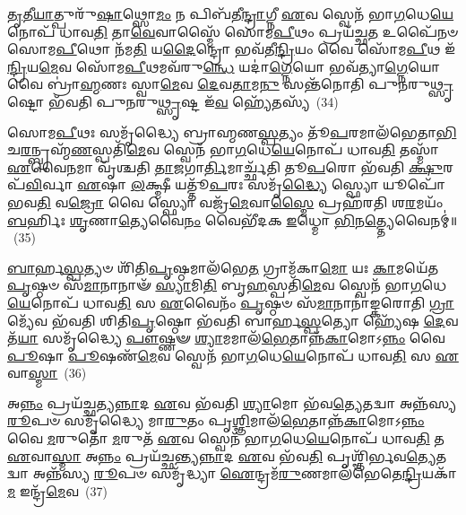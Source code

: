 \-\ul{𑌤𑍃}\-𑌤𑍀\-\ul{𑌯𑌾}\-𑌤𑍍𑌪𑍁𑌰𑍁᳴\-\ul{𑌷𑌾}\-𑌥𑍍𑌸𑍋\-\ul{𑌮𑌂} 𑌨 𑌪𑌿𑌬᳴𑌤𑍀\-\ul{𑌨𑍍𑌦𑍍𑌰𑌾}\-𑌗𑍍𑌨𑍀 \ul{𑌏}\-𑌵 𑌸𑍍𑌵𑍇𑌨᳴ 𑌭𑌾\-\ul{𑌗}\-𑌧𑍇\-\ul{𑌯𑍇}\-𑌨𑍋𑌪᳴ 𑌧𑌾𑌵\-\ul{𑌤𑌿} 𑌤𑌾\-\ul{𑌵𑍇}\-𑌵𑌾𑌸𑍍𑌮𑍈᳴ 𑌸𑍋𑌮\-\ul{𑌪𑍀}\-𑌥𑌂 𑌪𑍍𑌰𑌯᳴𑌚𑍍𑌛\-\ul{𑌤} 𑌉𑌪𑍈᳴𑌨𑍞 𑌸𑍋𑌮\-\ul{𑌪𑍀}\-𑌥𑍋 𑌨᳴𑌮\-\ul{𑌤𑌿} 𑌯\-\ul{𑌦𑍈}\-𑌨𑍍𑌦𑍍𑌰𑍋 𑌭𑌵᳴𑌤𑍀\-\ul{𑌨𑍍𑌦𑍍𑌰𑌿}\-𑌯𑌂 𑌵𑍈 𑌸𑍋᳴𑌮\-\ul{𑌪𑍀}\-𑌥 𑌇᳴\-\ul{𑌨𑍍𑌦𑍍𑌰𑌿}\-𑌯\-\ul{𑌮𑍇}\-𑌵 𑌸𑍋᳴𑌮\-\ul{𑌪𑍀}\-𑌥𑌮𑌵᳴\-𑌰𑍁\-\ul{𑌨𑍍𑌧𑍇} 𑌯𑌦𑌾॑\-\ul{𑌗𑍍𑌨𑍇}\-𑌯𑍋 𑌭𑌵᳴𑌤𑍍𑌯𑌾\-\ul{𑌗𑍍𑌨𑍇}\-𑌯𑍋 𑌵𑍈 𑌬𑍍𑌰𑌾॑\-\ul{𑌹𑍍𑌮}\-𑌣𑌃 𑌸𑍍𑌵𑌾\-\ul{𑌮𑍇}\-𑌵 \ul{𑌦𑍇}\-𑌵\-\ul{𑌤𑌾}\-𑌮\-\ul{𑌨𑍁} 𑌸𑌨𑍍𑌤᳴𑌨𑍋𑌤𑌿 𑌪𑍁𑌨𑌰𑍁\-\ul{𑌥𑍍𑌸𑍃}\-𑌷𑍍𑌟𑍋 𑌭᳴𑌵𑌤𑌿 𑌪𑍁𑌨𑌰𑍁\-\ul{𑌥𑍍𑌸𑍃}\-𑌷𑍍𑌟 𑌇᳴\-\ul{𑌵} 𑌹𑍍𑌯𑍇᳴𑌤𑌸𑍍𑌯᳴~(34)

𑌸𑍋𑌮\-\ul{𑌪𑍀}\-𑌥𑌃 𑌸𑌮𑍃᳴𑌦𑍍𑌧𑍍𑌯𑍈 𑌬𑍍𑌰𑌾𑌹𑍍𑌮𑌣\-\ul{𑌸𑍍𑌪}\-𑌤𑍍𑌯𑌂 𑌤𑍂᳴\-\ul{𑌪}\-𑌰𑌮𑌾𑌲᳴𑌭𑍇𑌤𑌾\-\ul{𑌭𑌿}\-\-𑌚\-\ul{𑌰}\-𑌨𑍍𑌬𑍍𑌰𑌹𑍍𑌮᳴\-\ul{𑌣}\-𑌸𑍍𑌪𑌤𑌿᳴\-\ul{𑌮𑍇}\-𑌵 𑌸𑍍𑌵𑍇𑌨᳴ 𑌭𑌾\-\ul{𑌗}\-𑌧𑍇\-\ul{𑌯𑍇}\-𑌨𑍋𑌪᳴ 𑌧𑌾𑌵\-\ul{𑌤𑌿} 𑌤𑌸𑍍𑌮𑌾᳴ \ul{𑌏}\-𑌵𑍈\-\ul{𑌨}\-𑌮𑌾 𑌵𑍃᳴𑌶𑍍𑌚𑌤𑌿 \ul{𑌤𑌾}\-𑌜𑌗𑌾\-\ul{𑌰𑍍𑌤𑌿}\-𑌮𑌾𑌰𑍍𑌚𑍍𑌛᳴𑌤𑌿 𑌤𑍂\-\ul{𑌪}\-𑌰𑍋 𑌭᳴𑌵𑌤𑌿 \ul{𑌕𑍍𑌷𑍁}\-𑌰𑌪᳴\-\ul{𑌵𑌿}\-𑌰𑍍𑌵𑌾 \ul{𑌏}\-𑌷𑌾 \ul{𑌲}\-𑌕𑍍𑌷𑍍𑌮𑍀 𑌯𑌤𑍍𑌤𑍂᳴\-\ul{𑌪}\-𑌰𑌃 𑌸𑌮𑍃᳴\-\ul{𑌦𑍍𑌧𑍍𑌯𑍈} 𑌸𑍍𑌫𑍍𑌯𑍋 𑌯𑍂𑌪𑍋᳴ 𑌭𑌵\-\ul{𑌤𑌿} 𑌵\-\ul{𑌜𑍍𑌰𑍋} 𑌵𑍈 𑌸𑍍𑌫𑍍𑌯𑍋 𑌵𑌜𑍍𑌰᳴\-\ul{𑌮𑍇}\-𑌵𑌾\-\ul{𑌸𑍍𑌮𑍈} 𑌪𑍍𑌰𑌹᳴𑌰𑌤𑌿 𑌶\-\ul{𑌰}\-𑌮𑌯𑌂᳴ \ul{𑌬}\-𑌰𑍍\mbox{}𑌹𑌿𑌃 \ul{𑌶𑍃}\-𑌣𑌾\-\ul{𑌤𑍍𑌯𑍇}\-𑌵𑍈\-\ul{𑌨𑌂} 𑌵𑍈𑌭𑍀᳴𑌦𑌕 \ul{𑌇}\-𑌧𑍍𑌮𑍋 \ul{𑌭𑌿}\-𑌨\-\ul{𑌤𑍍𑌤𑍍𑌯𑍇}\-𑌵𑍈𑌨𑌮𑍍॑॥~(35)

{\anuvakamend[{\-\ul{𑌭}\-\-\ul{𑌵}\-\-\ul{𑌤𑍍𑌯𑍁}\-\-\ul{𑌨𑍍𑌨}\-𑌤𑌃 \ul{𑌪}\-𑌶𑌵𑍋᳴ 𑌜𑌨𑌯𑌨𑍍𑌤𑌿 \ul{𑌵𑌿}\-𑌨𑍍𑌦𑌤𑍇᳴\-𑌽𑌭\-\ul{𑌵}\-𑌥𑍍𑌸𑌨𑍍𑌨𑍈𑌤\-\ul{𑌸𑍍𑌯𑍇}\-𑌦𑍍𑌧𑍍𑌮𑌸𑍍𑌤𑍍𑌰𑍀𑌣𑌿᳴ 𑌚}]}%

\-\ul{𑌬𑌾}\-𑌰𑍍\mbox{}\-\ul{𑌹}\-\-\ul{𑌸𑍍𑌪}\-𑌤𑍍𑌯𑍞 𑌶𑌿᳴𑌤𑌿\-\ul{𑌪𑍃}\-𑌷𑍍𑌠𑌮𑌾\-𑌲᳴𑌭𑍇\-\ul{𑌤} 𑌗𑍍𑌰𑌾𑌮᳴𑌕𑌾\-\ul{𑌮𑍋} 𑌯𑌃 \ul{𑌕𑌾}\-𑌮𑌯𑍇᳴𑌤 \ul{𑌪𑍃}\-𑌷𑍍𑌠𑍞 𑌸᳴\-\ul{𑌮𑌾}\-𑌨𑌾𑌨𑌾𑍟᳴ \ul{𑌸𑍍𑌯𑌾}\-𑌮𑌿\-\ul{𑌤𑌿} 𑌬𑍃\-\ul{𑌹}\-𑌸𑍍𑌪𑌤𑌿᳴\-\ul{𑌮𑍇}\-𑌵 𑌸𑍍𑌵𑍇𑌨᳴ 𑌭𑌾\-\ul{𑌗}\-𑌧𑍇\-\ul{𑌯𑍇}\-𑌨𑍋𑌪᳴ 𑌧𑌾𑌵\-\ul{𑌤𑌿} 𑌸 \ul{𑌏}\-𑌵𑍈𑌨𑌂᳴ \ul{𑌪𑍃}\-𑌷𑍍𑌠𑍞 𑌸᳴\-\ul{𑌮𑌾}\-𑌨𑌾𑌨𑌾॑𑌙𑍍𑌕𑌰𑍋𑌤𑌿 \ul{𑌗𑍍𑌰𑌾}\-𑌮𑍍𑌯𑍇᳴𑌵 𑌭᳴𑌵𑌤𑌿 𑌶𑌿𑌤𑌿\-\ul{𑌪𑍃}\-𑌷𑍍𑌠𑍋 𑌭᳴𑌵𑌤𑌿 𑌬𑌾𑌰𑍍\mbox{}𑌹\-\ul{𑌸𑍍𑌪}\-𑌤𑍍𑌯𑍋 𑌹𑍍𑌯𑍇᳴𑌷 \ul{𑌦𑍇}\-𑌵𑌤᳴\-\ul{𑌯𑌾} 𑌸𑌮𑍃᳴𑌦𑍍𑌧𑍍𑌯𑍈 \ul{𑌪𑍗}\-𑌷𑍍𑌣𑍟 \ul{𑌶𑍍𑌯𑌾}\-𑌮𑌮𑌾𑌲᳴\-\ul{𑌭𑍇}\-𑌤𑌾𑌨𑍍𑌨᳴\-\ul{𑌕𑌾}\-𑌮𑍋\-𑌽\-\ul{𑌨𑍍𑌨𑌂} 𑌵𑍈 \ul{𑌪𑍂}\-𑌷𑌾 \ul{𑌪𑍂}\-𑌷𑌣᳴\-\ul{𑌮𑍇}\-𑌵 𑌸𑍍𑌵𑍇𑌨᳴ 𑌭𑌾\-\ul{𑌗}\-𑌧𑍇\-\ul{𑌯𑍇}\-𑌨𑍋𑌪᳴ 𑌧𑌾𑌵\-\ul{𑌤𑌿} 𑌸 \ul{𑌏}\-𑌵𑌾\-\ul{𑌸𑍍𑌮𑌾}\-~(36)

𑌅\-\ul{𑌨𑍍𑌨𑌂} 𑌪𑍍𑌰𑌯᳴𑌚𑍍𑌛𑌤𑍍𑌯\-\ul{𑌨𑍍𑌨𑌾}\-𑌦 \ul{𑌏}\-𑌵 𑌭᳴𑌵𑌤𑌿 \ul{𑌶𑍍𑌯𑌾}\-𑌮𑍋 𑌭᳴𑌵\-\ul{𑌤𑍍𑌯𑍇}\-𑌤𑌦𑍍𑌵𑌾 𑌅𑌨𑍍𑌨᳴𑌸𑍍𑌯 \ul{𑌰𑍂}\-𑌪𑍞 𑌸𑌮𑍃᳴𑌦𑍍𑌧𑍍𑌯𑍈 𑌮𑌾\-\ul{𑌰𑍁}\-𑌤𑌂 𑌪𑍃\-\ul{𑌶𑍍𑌞𑌿}\-𑌮𑌾𑌲᳴\-\ul{𑌭𑍇}\-𑌤𑌾𑌨𑍍𑌨᳴\-\ul{𑌕𑌾}\-𑌮𑍋\-𑌽\-\ul{𑌨𑍍𑌨𑌂} 𑌵𑍈 \ul{𑌮}\-𑌰𑍁𑌤𑍋᳴ \ul{𑌮}\-𑌰𑍁𑌤᳴ \ul{𑌏}\-𑌵 𑌸𑍍𑌵𑍇𑌨᳴ 𑌭𑌾\-\ul{𑌗}\-𑌧𑍇\-\ul{𑌯𑍇}\-𑌨𑍋𑌪᳴ 𑌧𑌾𑌵\-\ul{𑌤𑌿} 𑌤 \ul{𑌏}\-𑌵𑌾\-\ul{𑌸𑍍𑌮𑌾} 𑌅\-\ul{𑌨𑍍𑌨𑌂} 𑌪𑍍𑌰𑌯᳴𑌚𑍍𑌛𑌨𑍍𑌤𑍍𑌯\-\ul{𑌨𑍍𑌨𑌾}\-𑌦 \ul{𑌏}\-𑌵 𑌭᳴𑌵\-\ul{𑌤𑌿} 𑌪𑍃𑌶𑍍𑌞𑌿᳴𑌰𑍍𑌭𑌵\-\ul{𑌤𑍍𑌯𑍇}\-𑌤𑌦𑍍𑌵𑌾 𑌅𑌨𑍍𑌨᳴𑌸𑍍𑌯 \ul{𑌰𑍂}\-𑌪𑍞 𑌸𑌮𑍃᳴𑌦𑍍𑌧𑍍𑌯𑌾 \ul{𑌐}\-𑌨𑍍𑌦𑍍𑌰𑌮᳴\-\ul{𑌰𑍁}\-𑌣𑌮𑌾𑌲᳴𑌭𑍇𑌤𑍇\-\ul{𑌨𑍍𑌦𑍍𑌰𑌿}\-𑌯𑌕𑌾᳴\-\ul{𑌮} 𑌇𑌨𑍍𑌦𑍍𑌰᳴\-\ul{𑌮𑍇}\-𑌵~(37)

